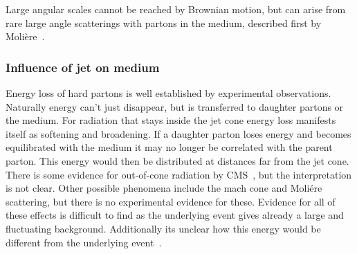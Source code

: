 \noindent Large angular scales cannot be reached by Brownian motion, but can arise from rare large angle scatterings with partons in the medium, described first by Molière~\cite{missing}.



\subsubsection*{Influence of jet on medium}
Energy loss of hard partons is well established by experimental observations. Naturally energy can't just disappear, but is transferred to daughter partons or the medium. For radiation that stays inside the jet cone energy loss manifests itself as softening and broadening. If a daughter parton loses energy and becomes equilibrated with the medium it may no longer be correlated with the parent parton. This energy would then be distributed at distances far from the jet cone. There is some evidence for out-of-cone radiation by CMS~\cite{Chatrchyan:2011sx}, but the interpretation is not clear. Other possible phenomena include the mach cone and Moliére scattering, but there is no experimental evidence for these. Evidence for all of these effects is difficult to find as the underlying event gives already a large and fluctuating background. Additionally its unclear how this energy would be different from the underlying event~\cite{Connors:2017ptx}.
